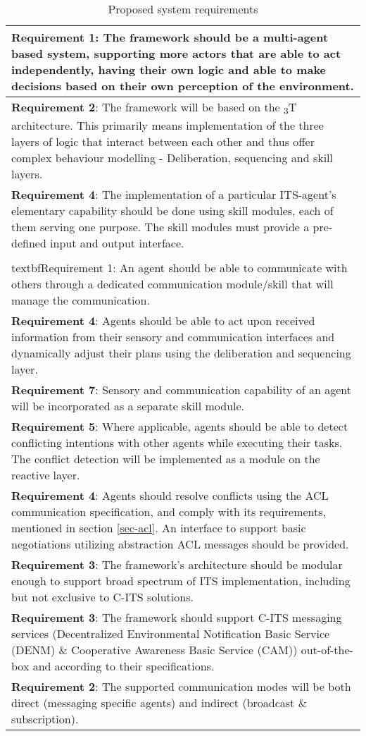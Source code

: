 \documentclass[main.tex]{subfiles}
\begin{document}
\begin{table}[htbp]
    \small
    \caption{Proposed system requirements}
    \centering\begin{tabular}{>{\footnotesize}p{}}
        \toprule 
\textbf{Requirement 1}: The framework should be a multi-agent based system, supporting more actors 
that are able to act independently, having their own logic and able to make decisions based on their 
own perception of the environment.
\\ \midrule
\textbf{Requirement 2}: The framework will be based on the \textsubscript{3}T architecture. 
This primarily means implementation of the three layers of logic that interact between each other and thus 
offer complex behaviour modelling - Deliberation, sequencing and skill layers.
\\ \midrule
\textbf{Requirement 4}: The implementation of a particular ITS-agent's elementary
capability should be done using skill modules, each of them serving one purpose. The skill modules must provide a
pre-defined input and output interface.
\\ \midrule
\\textbf{Requirement 1}: An agent should be able to communicate with others through a dedicated communication module/skill 
that will manage the communication.
\\ \midrule
\textbf{Requirement 4}: Agents should be able to act upon received information from their sensory and communication interfaces
and dynamically adjust their plans using the deliberation and sequencing layer.
\\ \midrule
\textbf{Requirement 7}: Sensory and communication capability of an agent will be incorporated 
as a separate skill module.
\\ \midrule
\textbf{Requirement 5}: Where applicable, agents should be able to detect conflicting intentions with other agents
while executing their tasks. The conflict detection will be implemented as a module on the reactive layer.
\\ \midrule
\textbf{Requirement 4}: Agents should resolve conflicts using the ACL communication
specification, and comply with its requirements, mentioned in section \ref{sec-acl}. An
interface to support basic negotiations utilizing abstraction ACL messages should be provided.
\\ \midrule
\textbf{Requirement 3}: The framework's architecture should be modular enough to support broad 
spectrum of ITS implementation, including but not exclusive to C-ITS solutions.
\\ \midrule
\textbf{Requirement 3}: The framework should support C-ITS messaging services (Decentralized
Environmental Notification Basic Service (DENM) \& Cooperative Awareness Basic Service (CAM))
out-of-the-box and according to their specifications.
\\ \midrule
\textbf{Requirement 2}: The supported communication modes will be both direct (messaging specific agents) and indirect  
(broadcast \& subscription). 
\\ \bottomrule
    \end{tabular}
    \label{sys-requirements}
\end{table}
\end{document}
